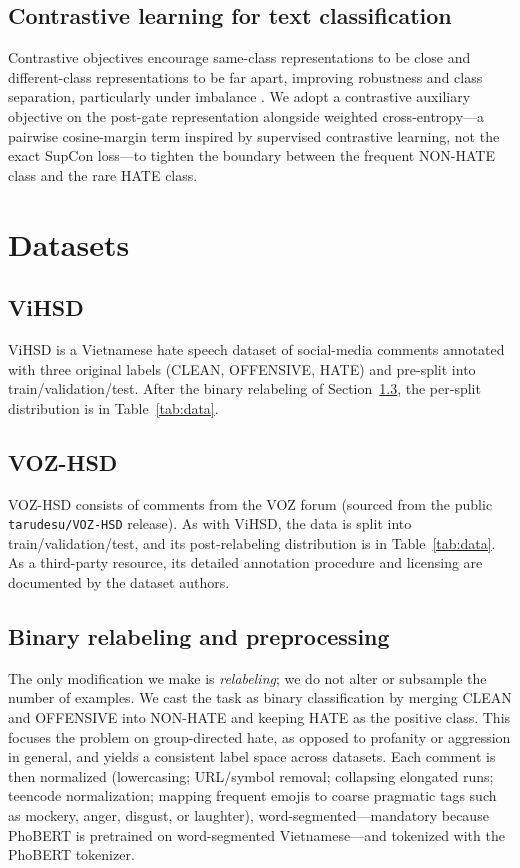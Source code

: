 \documentclass[11pt]{article}
\begin{document}
\subsection{Contrastive learning for text classification}
Contrastive objectives encourage same-class representations to be close and different-class representations to be far apart, improving robustness and class separation, particularly under imbalance \citep{supcon}. We adopt a contrastive auxiliary objective on the post-gate representation alongside weighted cross-entropy---a pairwise cosine-margin term inspired by supervised contrastive learning, not the exact SupCon loss---to tighten the boundary between the frequent NON-HATE class and the rare HATE class.

\section{Datasets}

\subsection{ViHSD}
ViHSD \citep{vihsd} is a Vietnamese hate speech dataset of social-media comments annotated with three original labels (CLEAN, OFFENSIVE, HATE) and pre-split into train/validation/test. After the binary relabeling of Section~\ref{sec:reshape}, the per-split distribution is in Table~\ref{tab:data}.

\subsection{VOZ-HSD}
VOZ-HSD \citep{vozhsd} consists of comments from the VOZ forum (sourced from the public \texttt{tarudesu/VOZ-HSD} release). As with ViHSD, the data is split into train/validation/test, and its post-relabeling distribution is in Table~\ref{tab:data}. As a third-party resource, its detailed annotation procedure and licensing are documented by the dataset authors.

\subsection{Binary relabeling and preprocessing}
\label{sec:reshape}
The only modification we make is \emph{relabeling}; we do not alter or subsample the number of examples. We cast the task as binary classification by merging CLEAN and OFFENSIVE into NON-HATE and keeping HATE as the positive class. This focuses the problem on group-directed hate, as opposed to profanity or aggression in general, and yields a consistent label space across datasets. Each comment is then normalized (lowercasing; URL/symbol removal; collapsing elongated runs; teencode normalization; mapping frequent emojis to coarse pragmatic tags such as mockery, anger, disgust, or laughter), word-segmented---mandatory because PhoBERT is pretrained on word-segmented Vietnamese---and tokenized with the PhoBERT tokenizer.
\end{document}
